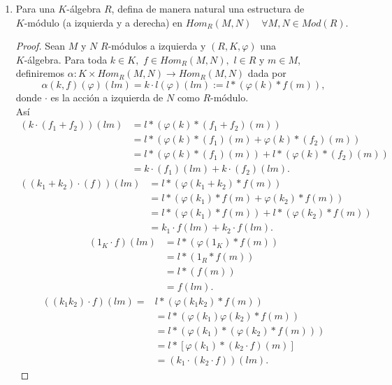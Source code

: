 \documentclass{article}
\begin{document}
\begin{enumerate}[label=\textbf{Ej \arabic*.}]
		\item Para una $K$-álgebra $R$, defina de manera natural una estructura de \\ $K$-módulo (a izquierda y a derecha)
		en $Hom_R(M,N)\quad \forall M,N\in Mod(R).$
		\begin{proof}
			Sean $M$ y $N$ $R$-módulos a izquierda y $(R,K,\varphi)$ una \\
			$K$-álgebra. Para toda $k\in K,\,\, f\in Hom_R(M,N),\,\, l\in R$ y $m\in M$, definiremos 
			$\alpha:K\times Hom_R(M,N)\longrightarrow Hom_R(M,N)$ dada por 
			\[\alpha(k,f)(\varphi)(lm)=k\cdot l(\varphi)(lm):=l*(\varphi(k)*f(m)),\]
			donde $\cdot$ es la acción a izquierda de $N$ como $R$-módulo.\\
			Así \\
			\begin{align*}
				( k\cdot(f_1+f_2))(lm)
				&=l*(\varphi(k)*(f_1+f_2)(m))\\
				&=l*(\varphi(k)*(f_1)(m)+\varphi(k)*(f_2)(m))\\
				&=l*(\varphi(k)*(f_1)(m))+l*(\varphi(k)*(f_2)(m))\\
				&=k\cdot(f_1)(lm)+k\cdot(f_2)(lm). 
			\end{align*}
			\begin{align*}
				((k_1+k_2)\cdot(f))(lm)
				&=l*(\varphi(k_1+k_2)*f(m))\\
				&=l*(\varphi(k_1)*f(m)+\varphi(k_2)*f(m))\\
				&=l*(\varphi(k_1)*f(m))+l*(\varphi(k_2)*f(m))\\
				&=k_1\cdot f(lm)+k_2\cdot f(lm).
			\end{align*}
			\begin{align*}
				(1_K\cdot f)(lm)&=l*(\varphi(1_K)*f(m))\\
				&=l*(1_R*f(m))\\
				&=l*(f(m))\\
				&=f(lm).
			\end{align*}
			\begin{align*}
				((k_1k_2)\cdot f)(lm)=&l*(\varphi(k_1k_2)*f(m))\\
				&=l*(\varphi(k_1)\varphi(k_2)*f(m))\\
				&=l*(\varphi(k_1)*(\varphi(k_2)*f(m)))\\
				&=l*[\varphi(k_1)*(k_2\cdot f)(m)]\\
				&=(k_1\cdot(k_2\cdot f))(lm).
			\end{align*}
			

\end{proof}
\end{enumerate}
\end{document}
